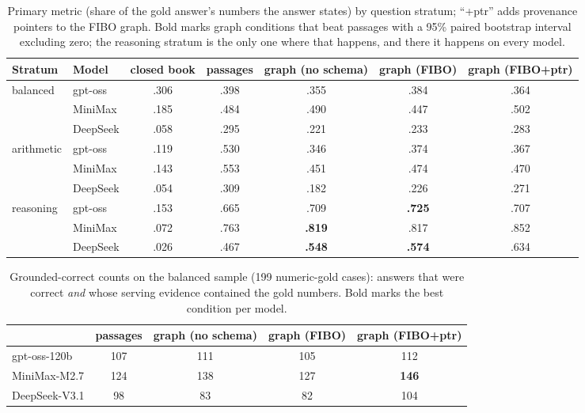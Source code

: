 \documentclass{article}
\begin{document}
\begin{table}[t]
\centering\scriptsize
\caption{Primary metric (share of the gold answer's numbers the answer
states) by question stratum; ``+ptr'' adds provenance pointers to the
FIBO graph. Bold marks graph conditions that beat passages with a 95\%
paired bootstrap interval excluding zero; the reasoning stratum is the
only one where that happens, and there it happens on every model.}
\label{tab:strata}
\setlength{\tabcolsep}{4.5pt}
\begin{tabular}{llccccc}
\toprule
Stratum & Model & closed book & passages & graph (no schema) & graph (FIBO) & graph (FIBO+ptr) \\
\midrule
\multirow{3}{*}{balanced}   & gpt-oss  & .306 & .398 & .355 & .384 & .364 \\
                            & MiniMax  & .185 & .484 & .490 & .447 & .502 \\
                            & DeepSeek & .058 & .295 & .221 & .233 & .283 \\
\midrule
\multirow{3}{*}{arithmetic} & gpt-oss  & .119 & .530 & .346 & .374 & .367 \\
                            & MiniMax  & .143 & .553 & .451 & .474 & .470 \\
                            & DeepSeek & .054 & .309 & .182 & .226 & .271 \\
\midrule
\multirow{3}{*}{reasoning}  & gpt-oss  & .153 & .665 & .709 & \textbf{.725} & .707 \\
                            & MiniMax  & .072 & .763 & \textbf{.819} & .817 & .852 \\
                            & DeepSeek & .026 & .467 & \textbf{.548} & \textbf{.574} & .634 \\
\bottomrule
\end{tabular}
\end{table}

\begin{table}[t]
\centering\footnotesize
\caption{Grounded-correct counts on the balanced sample (199
numeric-gold cases): answers that were correct \emph{and} whose serving
evidence contained the gold numbers. Bold marks the best condition per
model.}
\label{tab:ec}
\begin{tabular}{lcccc}
\toprule
 & passages & graph (no schema) & graph (FIBO) & graph (FIBO+ptr) \\
\midrule
gpt-oss-120b & 107 & 111 & 105 & 112 \\
MiniMax-M2.7 & 124 & 138 & 127 & \textbf{146} \\
DeepSeek-V3.1 & 98 & 83 & 82 & 104 \\
\bottomrule
\end{tabular}
\end{table}
\end{document}
